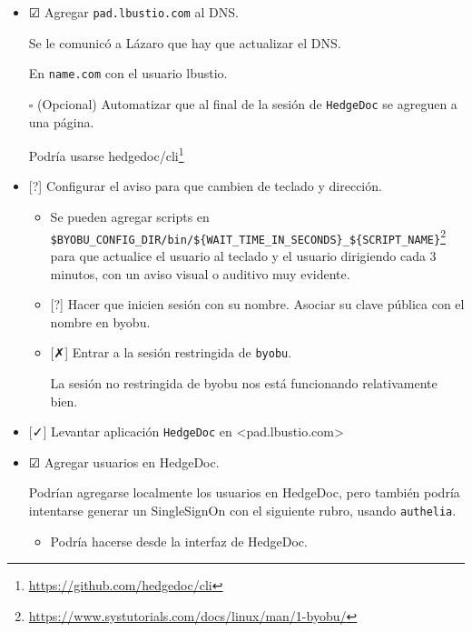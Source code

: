 \documentclass[
  12,
]{scrartcl}
\DeclareRobustCommand{\href}[2]{#2\footnote{\url{#1}}}
\begin{document}
\begin{itemize}
  -\textgreater{} Desafortunadamente, el proxy no está dirigiendo las
  aplicaciones como debe.

  \begin{itemize}
  \item
    🗵 Configurar \texttt{traefik} localmente.

    No será necesario jugar por el momento, porque el sistema reconoció
    \texttt{pad.lbustio.com}
  \end{itemize}
\item
  ☑ Agregar \texttt{pad.lbustio.com} al DNS.

  Se le comunicó a Lázaro que hay que actualizar el DNS.

  En \texttt{name.com} con el usuario lbustio.
\item[$\square$]
  (Opcional) Automatizar que al final de la sesión de \texttt{HedgeDoc}
  se agreguen a una página.

  Podría usarse \href{https://github.com/hedgedoc/cli}{hedgedoc/cli}
\item
  {[}?{]} Configurar el aviso para que cambien de teclado y dirección.

  \begin{itemize}
  \item
    \href{https://www.systutorials.com/docs/linux/man/1-byobu/}{Se
    pueden agregar scripts en
    \texttt{\$BYOBU\_CONFIG\_DIR/bin/\$\{WAIT\_TIME\_IN\_SECONDS\}\_\$\{SCRIPT\_NAME\}}}
    para que actualice el usuario al teclado y el usuario dirigiendo
    cada 3 minutos, con un aviso visual o auditivo muy evidente.
  \item
    {[}?{]} Hacer que inicien sesión con su nombre. Asociar su clave
    pública con el nombre en byobu.
  \item
    {[}✗{]} Entrar a la sesión restringida de \texttt{byobu}.

    La sesión no restringida de byobu nos está funcionando relativamente
    bien.
  \end{itemize}
\item
  {[}✓{]} Levantar aplicación \texttt{HedgeDoc} en
  \textless pad.lbustio.com\textgreater{}
\item
  ☑ Agregar usuarios en HedgeDoc.

  Podrían agregarse localmente los usuarios en HedgeDoc, pero también
  podría intentarse generar un SingleSignOn con el siguiente rubro,
  usando \texttt{authelia}.

  \begin{itemize}
  \item
    Podría hacerse desde la interfaz de HedgeDoc.


\end{itemize}
\end{itemize}
\end{document}
